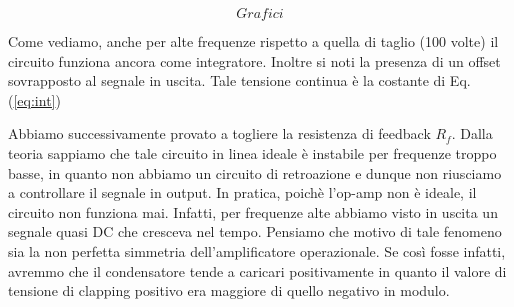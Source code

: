 $$Grafici$$

Come vediamo, anche per alte frequenze rispetto a quella di taglio (100 volte) il circuito funziona ancora come integratore. 
Inoltre si noti la presenza di un offset sovrapposto al segnale in uscita. Tale tensione continua è la costante di Eq.(\ref{eq:int})



Abbiamo successivamente provato a togliere la resistenza di feedback $R_f$.
Dalla teoria sappiamo che tale circuito in linea ideale è instabile per frequenze troppo basse, in quanto non abbiamo un circuito di retroazione e dunque non riusciamo a controllare il segnale in output.
In pratica, poichè l'op-amp non è ideale, il circuito non funziona mai.
Infatti, per frequenze alte abbiamo visto in uscita un segnale quasi DC che cresceva nel tempo.
Pensiamo che motivo di tale fenomeno sia la non perfetta simmetria dell'amplificatore operazionale.
Se così fosse infatti, avremmo che il condensatore tende a caricari positivamente in quanto il valore di tensione di clapping positivo era maggiore di quello negativo in modulo.
